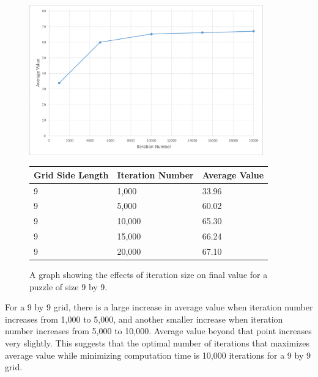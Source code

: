 \documentclass[12pt]{article}
\begin{document}
\begin{figure}[H]
    \centering
    \includegraphics[width=0.9\textwidth]{hill_climbing_9x9_iterations_excel}
\begin{tabular}{ |p{4cm}||p{4cm}|p{4cm}|  }
 \hline
Grid Side Length& Iteration Number &Average Value\\
 \hline
9&1,000&33.96\\
9&5,000&60.02\\
9&10,000&65.30\\
9&15,000&66.24\\
9&20,000&67.10\\
 \hline
\end{tabular}
    \caption{A graph showing the effects of iteration size on final value for a puzzle of size 9 by 9.}
    \label{fig:hill_climbing_9x9_iterations}
\end{figure}

For a 9 by 9 grid, there is a large increase in average value when iteration number increases from 1,000 to 5,000, and another smaller increase when iteration number increases from 5,000 to 10,000. Average value beyond that point increases very slightly. This suggests that the optimal number of iterations that maximizes average value while minimizing computation time is 10,000 iterations for a 9 by 9 grid.
\end{document}
